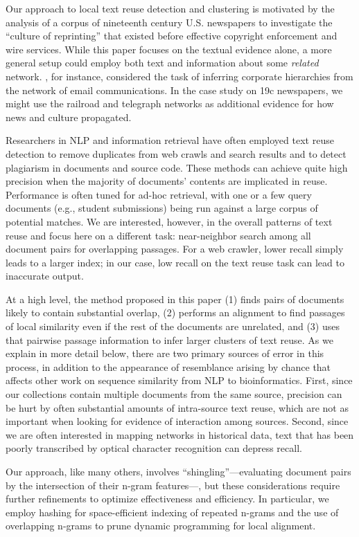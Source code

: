 \documentclass[pdftex,11pt]{article}
\begin{document}
Our approach to local text reuse detection and clustering is motivated
by the analysis of a corpus of nineteenth century U.S. newspapers to
investigate the ``culture of reprinting'' that existed before
effective copyright enforcement and wire services.  While this paper
focuses on the textual evidence alone, a more general setup could
employ both text and information about some \emph{related} network.
\citet{namata11:_collec_graph_ident}, for instance, considered the
task of inferring corporate hierarchies from the network of email
communications.  In the case study on 19c newspapers, we might use the
railroad and telegraph networks as additional evidence for how news
and culture propagated.

Researchers in NLP and information retrieval have often employed text
reuse detection to remove duplicates from web crawls and search
results and to detect plagiarism in documents and source code.  These
methods can achieve quite high precision when the majority of
documents' contents are implicated in reuse.  Performance is often
tuned for ad-hoc retrieval, with one or a few query documents (e.g.,
student submissions) being run against a large corpus of potential
matches.  We are interested, however, in the overall patterns of text
reuse and focus here on a different task: near-neighbor search among
all document pairs for overlapping passages.  For a web crawler, lower
recall simply leads to a larger index; in our case, low recall on the
text reuse task can lead to inaccurate output.

At a high level, the method proposed in this paper (1) finds pairs of
documents likely to contain substantial overlap, (2) performs an
alignment to find passages of local similarity even if the rest of the
documents are unrelated, and (3) uses that pairwise passage
information to infer larger clusters of text reuse.  As we explain in
more detail below, there are two primary sources of error in this
process, in addition to the appearance of resemblance arising by
chance that affects other work on sequence similarity from NLP to
bioinformatics.  First, since our collections contain multiple
documents from the same source, precision can be hurt by often
substantial amounts of intra-source text reuse, which are not as
important when looking for evidence of interaction among sources.
Second, since we are often interested in mapping networks in
historical data, text that has been poorly transcribed by optical
character recognition can depress recall.

Our approach, like many others, involves ``shingling''---evaluating
document pairs by the intersection of their n-gram features---, but
these considerations require further refinements to optimize
effectiveness and efficiency.  In particular, we employ hashing for
space-efficient indexing of repeated n-grams and the use of
overlapping n-grams to prune dynamic programming for local alignment.
\end{document}
